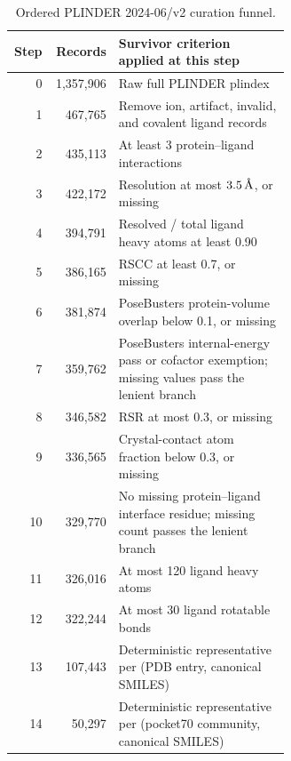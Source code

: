 \documentclass{article}
\newcommand{\angstrom}{\text{\normalfont\AA}}
\begin{document}
\begin{table}[htbp]
    \centering
    \small
    \caption{Ordered PLINDER 2024-06/v2 curation funnel.}
    \label{tab:si_curation}
    \begin{tabular}{rrp{0.62\linewidth}}
        \toprule
        Step & Records & Survivor criterion applied at this step \\
        \midrule
        0 & 1,357,906 & Raw full PLINDER plindex \\
        1 & 467,765 & Remove ion, artifact, invalid, and covalent ligand records \\
        2 & 435,113 & At least 3 protein--ligand interactions \\
        3 & 422,172 & Resolution at most $3.5\,\angstrom$, or missing \\
        4 & 394,791 & Resolved / total ligand heavy atoms at least 0.90 \\
        5 & 386,165 & RSCC at least 0.7, or missing \\
        6 & 381,874 & PoseBusters protein-volume overlap below 0.1, or missing \\
        7 & 359,762 & PoseBusters internal-energy pass or cofactor exemption; missing values pass the lenient branch \\
        8 & 346,582 & RSR at most 0.3, or missing \\
        9 & 336,565 & Crystal-contact atom fraction below 0.3, or missing \\
        10 & 329,770 & No missing protein--ligand interface residue; missing count passes the lenient branch \\
        11 & 326,016 & At most 120 ligand heavy atoms \\
        12 & 322,244 & At most 30 ligand rotatable bonds \\
        13 & 107,443 & Deterministic representative per (PDB entry, canonical SMILES) \\
        14 & 50,297 & Deterministic representative per (pocket70 community, canonical SMILES) \\
        \bottomrule
    \end{tabular}
\end{table}
\end{document}
